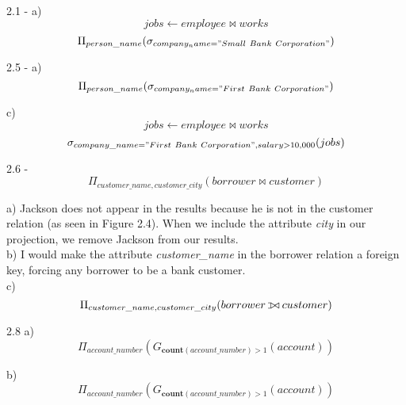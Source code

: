 \documentclass{article}
\def\ojoin{\setbox0=\hbox{$\bowtie$}%
  \rule[-.02ex]{.25em}{.4pt}\llap{\rule[\ht0]{.25em}{.4pt}}}
\def\leftouterjoin{\mathbin{\ojoin\mkern-5.8mu\bowtie}}
\begin{document}
2.1 - a) 
	\begin{equation}
		jobs \leftarrow employee \bowtie works 
	\end{equation}
	\begin{equation}
		\Pi_{person\_name} (\sigma_{company_name = "Small\ Bank\ Corporation"})
	\end{equation}

2.5 - a)
	\begin{equation}
		\Pi_{person\_name} (\sigma_{company_name = "First\ Bank\ Corporation"})
	\end{equation}

	c)
	\begin{equation}
		jobs \leftarrow employee \bowtie works 
	\end{equation}
	\begin{equation}
		\sigma_{company\_name = "First\ Bank\ Corporation", salary > 10,000}(jobs)
	\end{equation}

2.6 - \begin{equation}
		\Pi_{customer\_name, customer\_city}(borrower \bowtie customer)
	\end{equation}

a) Jackson does not appear in the results because he is not in the customer relation (as seen in 
Figure 2.4). When we include the attribute \textit{city} in our projection, we remove Jackson from our results. \\

b) I would make the attribute \textit{customer\_name} in the borrower relation a foreign key, forcing any borrower to be a bank customer. \\

c)\begin{equation}
		\Pi_{customer\_name, customer\_city}(borrower \leftouterjoin customer)
	\end{equation}


2.8 a)
	\begin{equation}
		\Pi_{account\_number} (G_{\textbf{count}(account\_number) > 1} (account))
	\end{equation}

	b)
	\begin{equation}
		\Pi_{account\_number} (G_{\textbf{count}(account\_number) > 1} (account))
	\end{equation}
\end{document}
